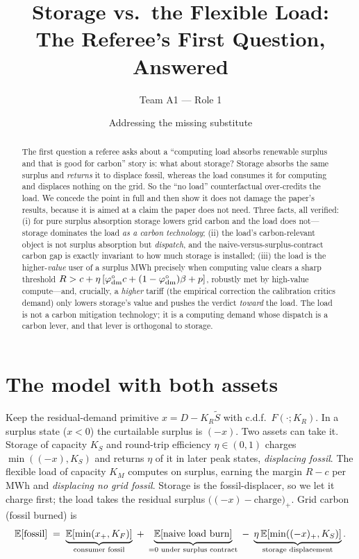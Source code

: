 \documentclass[11pt,reqno]{amsart}
\theoremstyle{plain}\newtheorem{proposition}{Proposition}\newtheorem{corollary}[proposition]{Corollary}
\theoremstyle{remark}\newtheorem{remark}[proposition]{Remark}
\newcommand{\KR}{K_R}\newcommand{\KF}{K_F}\newcommand{\KM}{K_M}\newcommand{\KS}{K_S}
\newcommand{\phio}{\varphi^{\circ}}
\begin{document}
\title[Storage competes for the same surplus]{Storage vs.\ the Flexible Load:\\
The Referee's First Question, Answered}
\author{Team A1 --- Role 1}
\date{Addressing the missing substitute}
\begin{abstract}
The first question a referee asks about a ``computing load absorbs renewable surplus and that
is good for carbon'' story is: what about storage? Storage absorbs the same surplus and
\emph{returns} it to displace fossil, whereas the load consumes it for computing and displaces
nothing on the grid. So the ``no load'' counterfactual over-credits the load. We concede the
point in full and then show it does not damage the paper's results, because it is aimed at a
claim the paper does not need. Three facts, all verified: (i) for pure surplus absorption
storage lowers grid carbon and the load does not---storage dominates the load \emph{as a
carbon technology}; (ii) the load's carbon-relevant object is not surplus absorption but
\emph{dispatch}, and the naive-versus-surplus-contract carbon gap is exactly invariant to how
much storage is installed; (iii) the load is the higher-\emph{value} user of a surplus MWh
precisely when computing value clears a sharp threshold $R>c+\eta\,[\phio_{\mathrm{dm}}c+(1-\phio_{\mathrm{dm}})\bp]$,
robustly met by high-value compute---and, crucially, a \emph{higher} tariff (the empirical
correction the calibration critics demand) only lowers storage's value and pushes the verdict
\emph{toward} the load. The load is not a carbon mitigation technology; it is a computing
demand whose dispatch is a carbon lever, and that lever is orthogonal to storage.
\end{abstract}
\maketitle

\section{The model with both assets}
Keep the residual-demand primitive $x=D-\KR\tilde S$ with c.d.f.\ $F(\cdot;\KR)$. In a surplus
state ($x<0$) the curtailable surplus is $(-x)$. Two assets can take it. Storage of capacity
$\KS$ and round-trip efficiency $\eta\in(0,1)$ charges $\min((-x),\KS)$ and returns $\eta$ of
it in later peak states, \emph{displacing fossil}. The flexible load of capacity $\KM$
computes on surplus, earning the margin $R-c$ per MWh and \emph{displacing no grid fossil}.
Storage is the fossil-displacer, so we let it charge first; the load takes the residual
surplus $\big((-x)-\text{charge}\big)_+$. Grid carbon (fossil burned) is
\begin{equation}\label{eq:carbon}
  \E[\text{fossil}] \;=\; \underbrace{\E[\min(x_+,\KF)]}_{\text{consumer fossil}}
  \;+\;\underbrace{\E[\text{naive load burn}]}_{=0\text{ under surplus contract}}
  \;-\;\underbrace{\eta\,\E[\min((-x)_+,\KS)]}_{\text{storage displacement}} .
\end{equation}
\end{document}
